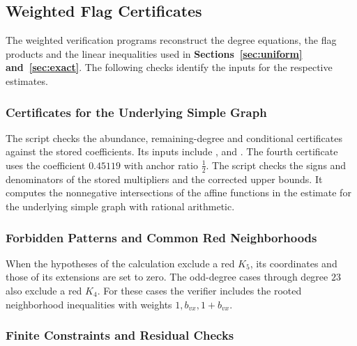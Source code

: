 \documentclass[preprint,11pt,numbers]{elsarticle-arxiv}
\numberwithin{equation}{section}
\theoremstyle{definition}
\begin{document}
\subsection{Weighted Flag Certificates}\label{app:multi-certificates}

The weighted verification programs reconstruct the degree equations,
the flag products and the linear inequalities used in
\textbf{Sections~\ref{sec:uniform} and~\ref{sec:exact}}.
The following checks identify the inputs for the respective estimates.

\subsubsection{Certificates for the Underlying Simple Graph}\label{app:multi-projection}

The script  checks the abundance,
remaining-degree and conditional certificates against the stored
coefficients. Its inputs include
,
 and
. The fourth
certificate uses the coefficient $0.45119$ with anchor ratio
$\frac12$. The script checks the signs and denominators of the
stored multipliers and the corrected upper bounds.
It computes the nonnegative intersections of the affine functions
in the estimate for the underlying simple graph with rational arithmetic.

\subsubsection{Forbidden Patterns and Common Red Neighborhoods}

When the hypotheses of the calculation exclude a red $K_5$, its
coordinates and those of its extensions are set to zero.
The odd-degree cases through degree $23$ also exclude a red $K_4$.
For these cases the verifier includes the rooted neighborhood
inequalities with weights $1,b_{vx},1+b_{vx}$.

\subsubsection{Finite Constraints and Residual Checks}\label{app:profile-verification}
\end{document}
